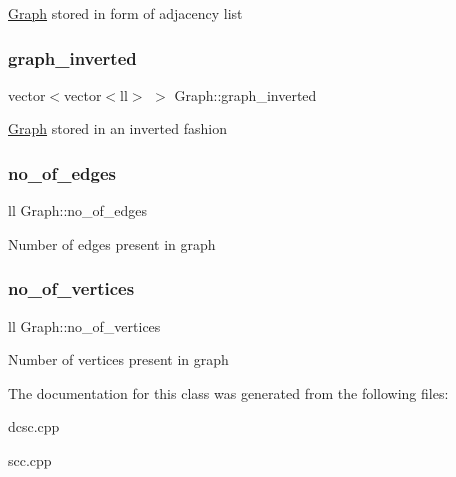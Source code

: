 \hyperlink{classGraph}{Graph} stored in form of adjacency list \mbox{\label{classGraph_ab0d5142a7def6b33069b6dbaba9fdf1c}} 
\subsubsection{\texorpdfstring{graph\+\_\+inverted}{graph\_inverted}}
{\footnotesize\ttfamily vector$<$vector$<$ll$>$ $>$ Graph\+::graph\+\_\+inverted}

\hyperlink{classGraph}{Graph} stored in an inverted fashion \mbox{\label{classGraph_a49735f451a8a2cd7ae8334df2adb42cf}} 
\subsubsection{\texorpdfstring{no\+\_\+of\+\_\+edges}{no\_of\_edges}}
{\footnotesize\ttfamily ll Graph\+::no\+\_\+of\+\_\+edges}

Number of edges present in graph \mbox{\label{classGraph_a9b23a1ce91eceed3856b453858e61a05}} 
\subsubsection{\texorpdfstring{no\+\_\+of\+\_\+vertices}{no\_of\_vertices}}
{\footnotesize\ttfamily ll Graph\+::no\+\_\+of\+\_\+vertices}

Number of vertices present in graph 

The documentation for this class was generated from the following files\+:\begin{DoxyCompactItemize}
\item 
dcsc.\+cpp\item 
scc.\+cpp\end{DoxyCompactItemize}
